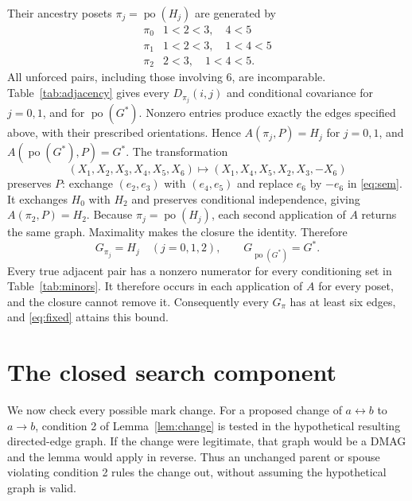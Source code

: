 \documentclass[11pt]{article}
\newcommand{\po}{\operatorname{po}}
\newcommand{\bidir}{\leftrightarrow}
\begin{document}
Their ancestry posets $\pi_j=\po(H_j)$ are generated by
\begin{equation}\label{eq:posets}
\begin{array}{c|l}
\pi_0&1<2<3,\quad4<5\\
\pi_1&1<2<3,\quad1<4<5\\
\pi_2&2<3,\quad1<4<5.
\end{array}
\end{equation}
All unforced pairs, including those involving 6, are incomparable.
Table~\ref{tab:adjacency} gives every $D_{\pi_j}(i,j)$ and conditional
covariance for $j=0,1$, and for $\po(G^*)$. Nonzero entries produce
exactly the edges specified above, with their prescribed orientations.
Hence $A(\pi_j,P)=H_j$ for $j=0,1$, and $A(\po(G^*),P)=G^*$.
The transformation
\[
(X_1,X_2,X_3,X_4,X_5,X_6)
\longmapsto (X_1,X_4,X_5,X_2,X_3,-X_6)
\]
preserves $P$: exchange $(e_2,e_3)$ with $(e_4,e_5)$ and replace $e_6$
by $-e_6$ in \eqref{eq:sem}. It exchanges $H_0$ with $H_2$ and
preserves conditional independence, giving $A(\pi_2,P)=H_2$.
Because $\pi_j=\po(H_j)$, each second application of $A$ returns the
same graph. Maximality makes the closure the identity. Therefore
\begin{equation}\label{eq:fixed}
G_{\pi_j}=H_j\quad(j=0,1,2),\qquad G_{\po(G^*)}=G^*.
\end{equation}
Every true adjacent pair has a nonzero numerator for every conditioning set
in Table~\ref{tab:minors}. It therefore occurs in each application of $A$
for every poset, and the closure cannot remove it. Consequently every
$G_\pi$ has at least six edges, and \eqref{eq:fixed} attains this bound.

\section{The closed search component}\label{sec:component}
We now check every possible mark change. For a proposed change of
$a\bidir b$ to $a\to b$, condition 2 of Lemma~\ref{lem:change} is tested
in the hypothetical resulting directed-edge graph. If the change were
legitimate, that graph would be a DMAG and the lemma would apply in reverse.
Thus an unchanged parent or spouse violating condition 2 rules the change
out, without assuming the hypothetical graph is valid.
\end{document}
